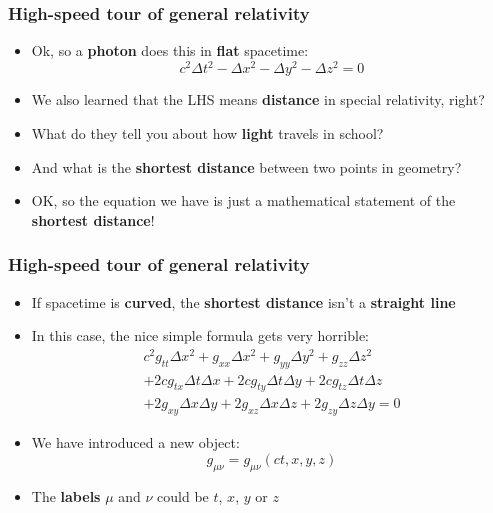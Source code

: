 \documentclass{beamer}
\begin{document}
\begin{frame}
  \frametitle{High-speed tour of general relativity}
  \begin{itemize}
    \item<1-> Ok, so a \textbf{photon} does this in \textbf{flat} spacetime:
      \begin{equation*}
	c^2\Delta t^2-\Delta x^2-\Delta y^2-\Delta z^2=0
      \end{equation*}
    \item<2-> We also learned that the LHS means \textbf{distance} in special relativity, right?
    \item<3-> What do they tell you about how \textbf{light} travels in school?
    \item<4-> And what is the \textbf{shortest distance} between two points in geometry? 
    \item<5-> OK, so the equation we have is just a mathematical statement of the \textbf{shortest distance}!
  \end{itemize}
\end{frame}

\begin{frame}
  \frametitle{High-speed tour of general relativity}
  \begin{itemize}
    \item<1-> If spacetime is \textbf{curved}, the \textbf{shortest distance} isn't a \textbf{straight line}
    \item<2-> In this case, the nice simple formula gets very horrible:
      \begin{gather*}
	c^2g_{tt}\Delta x^2+g_{xx}\Delta x^2+g_{yy}\Delta y^2+g_{zz}\Delta z^2\\
	+2cg_{tx}\Delta t\Delta x+2cg_{ty}\Delta t\Delta y+2cg_{tz}\Delta t\Delta z\\
	+2g_{xy}\Delta x\Delta y+2g_{xz}\Delta x\Delta z+2g_{zy}\Delta z\Delta y=0
      \end{gather*}
    \item<3-> We have introduced a new object:
      \begin{equation*}
	g_{\mu\nu}=g_{\mu\nu}(ct,x,y,z)
      \end{equation*}
    \item<4-> The \textbf{labels} $\mu$ and $\nu$ could be $t$, $x$, $y$ or $z$
  \end{itemize}
\end{frame}
\end{document}
